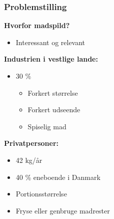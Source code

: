 \begin{frame}
\frametitle{Problemstilling}

	\textbf{Hvorfor madspild?}
	\begin{itemize}
		\item Interessant og relevant
	\end{itemize}
	
	\textbf{Industrien i vestlige lande:}
	\begin{itemize}		
		\item 30 \% 
		\begin{itemize}
			\item Forkert størrelse
			\item Forkert udseende
			\item Spiselig mad
		\end{itemize}
	\end{itemize}	
	\textbf{Privatpersoner:}	
	\begin{itemize}
		\item 42 kg/år
		\item 40 \% eneboende i Danmark
		\item Portionsstørrelse
		\item Fryse eller genbruge madrester
	\end{itemize}
	

\end{frame}